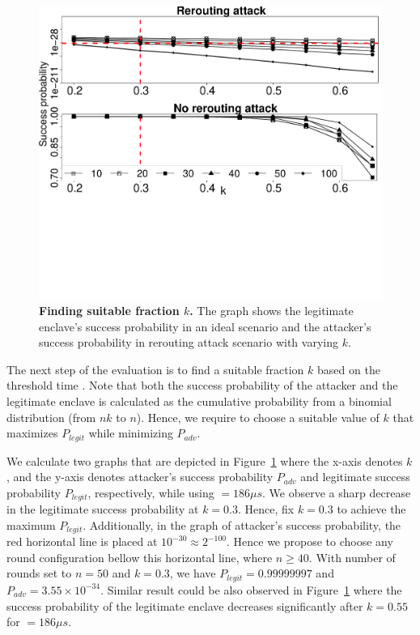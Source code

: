 \newcommand{\roundCompCaption}{\textbf{Finding suitable fraction $k$.} The graph shows the legitimate enclave's success probability in an ideal scenario and the attacker's success probability in rerouting attack scenario with varying $k$.}

\begin{figure}[t]
  \centering
    \includegraphics[trim={0 10cm 0 0}, clip, width=\linewidth]{data/fx3_data/round_comp_new.pdf}
    \caption{\roundCompCaption}
    \label{graph:roundSuccess}
\end{figure}


 The next step of the evaluation is to find a suitable fraction $k$ based on the threshold time \connect. Note that both the success probability of the attacker and the legitimate enclave is calculated as the cumulative probability from a binomial distribution (from $nk$ to $n$). Hence, we require to choose a suitable value of $k$ that maximizes $P_{legit}$ while minimizing $P_{adv}$.

We calculate two graphs that are depicted in Figure~\ref{graph:roundSuccess} where the x-axis denotes $k$, and the y-axis denotes attacker's success probability $P_{adv}$ and legitimate success probability $P_{legit}$, respectively, while using \connect$=186 \mu s$. We observe a sharp decrease in the legitimate success probability at $k=0.3$. Hence, fix $k=0.3$ to achieve the maximum $P_{legit}$. Additionally, in the graph of attacker's success probability, the red horizontal line is placed at $10^{-30} \approx 2^{-100}$. Hence we propose to choose any round configuration bellow this horizontal line, where $n \geq 40$. With number of rounds set to $n=50$ and $k=0.3$, we have $P_{legit}=0.99999997$ and $P_{adv}=3.55\times 10^{-34}$. Similar result could be also observed in Figure~\ref{graph:roundSuccess} where the success probability of the legitimate enclave decreases significantly after $k=0.55$ for \connect$=186\mu s$.

